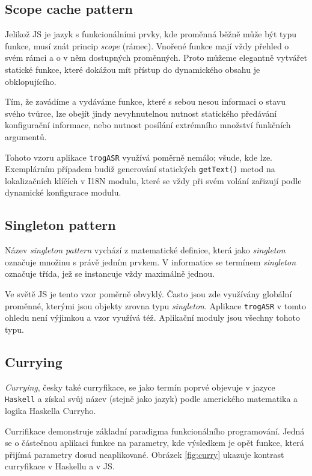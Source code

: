 \subsection{Scope cache pattern}

Jelikož JS je jazyk s funkcionálními prvky, kde proměnná běžně může být typu funkce, musí znát princip {\sl scope} (rámec). Vnořené funkce mají vždy přehled o svém rámci a o v něm dostupných proměnných. Proto můžeme elegantně vytvářet statické funkce, které dokážou mít přístup do dynamického obsahu je obklopujícího.

Tím, že zavádíme a vydáváme funkce, které s sebou nesou informaci o stavu svého tvůrce, lze obejít jindy nevyhnutelnou nutnost statického předávání konfigurační informace, nebo nutnost posílání extrémního množství funkčních argumentů.

Tohoto vzoru aplikace \verb|trogASR| využívá poměrně nemálo; všude, kde lze. Exemplárním případem budiž generování statických \verb|getText()| metod na lokalizačních klíčích v I18N modulu, které se vždy při svém volání zařizují podle dynamické konfigurace modulu.

\subsection{Singleton pattern}

Název {\sl singleton pattern} vychází z matematické definice, která jako {\sl singleton} označuje množinu s právě jedním prvkem. V informatice se termínem {\sl singleton} označuje třída, jež se instancuje vždy maximálně jednou.

Ve světě JS je tento vzor poměrně obvyklý. Často jsou zde využívány globální proměnné, kterými jsou objekty zrovna typu {\sl singleton}. Aplikace \verb|trogASR| v tomto ohledu není výjimkou a vzor využívá též. Aplikační moduly jsou všechny tohoto typu.

\subsection{Currying}

{\sl Currying}, česky také curryfikace, se jako termín poprvé objevuje v jazyce \verb|Haskell| a získal svůj název (stejně jako jazyk) podle amerického matematika a logika Haskella Curryho.

Currifikace demonstruje základní paradigma funkcionálního programování. Jedná se o částečnou aplikaci funkce na parametry, kde výsledkem je opět funkce, která přijímá parametry dosud neaplikované. Obrázek \ref{fig:curry} ukazuje kontrast curryfikace v Haskellu a v JS.


